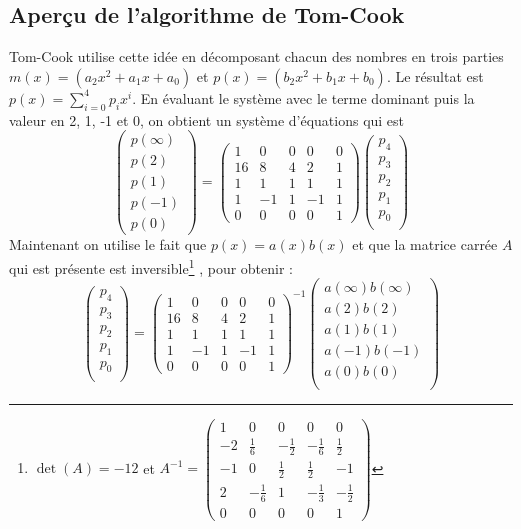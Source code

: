 \documentclass[11pt,french]{article}
\theoremstyle{plain}
\begin{document}
\subsection{Aperçu de l'algorithme de Tom-Cook}
Tom-Cook utilise cette idée en décomposant chacun des nombres en trois parties $m(x)=\left(a_2 x^2+ a_1 x + a_0 \right) $  et $p(x)=\left(b_2 x^2+ b_1 x + b_0 \right)$.  Le résultat est $p(x)=\sum_{i=0}^{4}p_i x^i$.
En évaluant le système avec le terme dominant puis la valeur en 2, 1, -1 et 0, on obtient un système d'équations qui est 
\[
 \begin{pmatrix}
 p(\infty)\\
 p(2)\\
 p(1)\\
 p(-1)\\
 p(0)
 \end{pmatrix}
  = \begin{pmatrix}
1 & 0 & 0 & 0 & 0 \\
16 & 8 & 4 & 2 & 1 \\
1 & 1 & 1 & 1 & 1 \\
1 & -1 & 1 & -1 & 1 \\
0 & 0 & 0 & 0 &  1 
\end{pmatrix}  \begin{pmatrix}
p_4\\
p_3\\
p_2\\
p_1\\
p_0\\
\end{pmatrix}
\]
Maintenant on utilise le fait que $p(x)=a(x)b(x)$ et que la matrice carrée $A$ qui est présente est inversible\footnote{$\det(A)=-12$ et $A^{-1}=\begin{pmatrix}
    1 & 0 & 0 & 0 & 0 \\
    -2& \frac{1}{6} & -\frac12 & -\frac16  & \frac12  \\
    -1 & 0 & \frac12  & \frac12  & -1 \\
    2 & -\frac16  & 1 & -\frac13  & -\frac12  \\
    0 & 0 & 0 & 0 &  1 
    \end{pmatrix}$}  , pour obtenir :
\[
 \begin{pmatrix}
p_4\\
p_3\\
p_2\\
p_1\\
p_0\\
\end{pmatrix}= \begin{pmatrix}
1 & 0 & 0 & 0 & 0 \\
16 & 8 & 4 & 2 & 1 \\
1 & 1 & 1 & 1 & 1 \\
1 & -1 & 1 & -1 & 1 \\
0 & 0 & 0 & 0 &  1 
\end{pmatrix}^{-1}  \begin{pmatrix}
a(\infty)b(\infty)\\
a(2)b(2)\\
a(1)b(1)\\
a(-1)b(-1)\\
a(0)b(0)\\
\end{pmatrix}
  \] 
\end{document}
